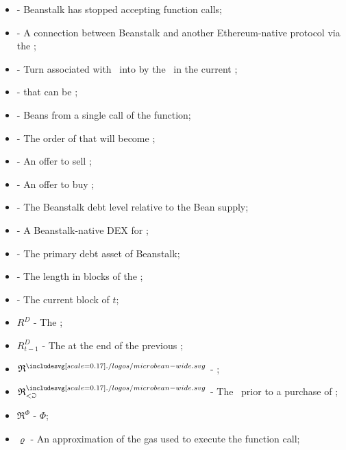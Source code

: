 \documentclass[class=article, crop=false]{standalone}
\begin{document}
\begin{itemize}[topsep=0pt, itemsep=3pt,leftmargin=16pt]
    \item[]  - \hypertarget{ht145}{Beanstalk has stopped accepting  function calls};
    \item[]  - \hypertarget{ht146}{A connection between Beanstalk and another Ethereum-native protocol via the };
    \item[]  - \hypertarget{ht147}{Turn  associated with  \Bean\ into  by  the  \Bean\ in the current };
    \item[]  - \hypertarget{ht148}{ that can be };
    \item[]  - \hypertarget{ht149}{Beans  from a single call of the  function};
    \item[]  - \hypertarget{ht150}{The order of  that will become };
    \item[]  - \hypertarget{ht151}{An offer to sell };
    \item[]  - \hypertarget{ht152}{An offer to buy };
    \item[]  - \hypertarget{ht153}{The Beanstalk debt level relative to the Bean supply};
    \item[]  - \hypertarget{ht154}{A Beanstalk-native DEX for };
    \item[]  - \hypertarget{ht155}{The primary debt asset of Beanstalk};
    \item[]  - The length in blocks of the ;
    \item[]  - The current block of $t$;
    \item[] $R^D$ - \hypertarget{ht156}{The };
    \item[] $R^D_{t-1}$ - \hypertarget{ht157}{The  at the end of the previous };
    \item[] $\mathfrak{R}^{\bean}$ - \hypertarget{ht158}{ \Bean};
    \item[] $\mathfrak{R}_{<\Game}^{\bean}$ - \hypertarget{ht159}{The  \Bean\ prior to a purchase of };
    \item[] $\mathfrak{R}^{\Phi}$ - \hypertarget{ht160}{ $\Phi$};
    \item[] $\varrho$ - An approximation of the gas used to execute the  function call;

\end{itemize}
\end{document}
